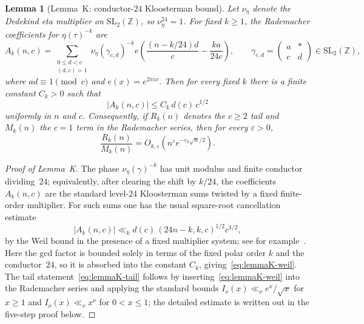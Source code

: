 \documentclass[11pt,a4paper]{article}
\newtheorem{lemma}[theorem]{Lemma}
\begin{document}
\begin{lemma}[Lemma~K: conductor-$24$ Kloosterman bound]\label{lem:K}
Let $\nu_{\eta}$ denote the Dedekind eta multiplier on $\mathrm{SL}_2(\mathbb Z)$, so $\nu_{\eta}^{24}=1$. For fixed $k\ge1$, the Rademacher coefficients for $\eta(\tau)^{-k}$ are
\[
  A_k(n,c)
  = \sum_{\substack{0\le d<c\\ (d,c)=1}}
    \nu_{\eta}(\gamma_{c,d})^{-k}
    e\!\left(\frac{(n-k/24)d}{c}-\frac{k a}{24c}\right),
  \qquad
  \gamma_{c,d}=\begin{pmatrix} a & *\\ c & d\end{pmatrix}\in \mathrm{SL}_2(\mathbb Z),
\]
where $ad\equiv 1\pmod c$ and $e(x)=e^{2\pi i x}$. Then for every fixed $k$ there is a finite constant $C_k>0$ such that
\begin{equation}\label{eq:lemmaK-weil}
  |A_k(n,c)| \le C_k\,d(c)\,c^{1/2}
\end{equation}
uniformly in $n$ and $c$. Consequently, if $R_k(n)$ denotes the $c\ge2$ tail and $M_k(n)$ the $c=1$ term in the Rademacher series, then for every $\varepsilon>0$,
\begin{equation}\label{eq:lemmaK-tail}
  \frac{R_k(n)}{M_k(n)}=O_{k,\varepsilon}\!\left(n^{\varepsilon}e^{-c_k\sqrt n/2}\right).
\end{equation}
\end{lemma}

\begin{proof}[Proof of Lemma~K]
The phase $\nu_{\eta}(\gamma)^{-k}$ has unit modulus and finite conductor dividing~$24$; equivalently, after clearing the shift by $k/24$, the coefficients $A_k(n,c)$ are the standard level-$24$ Kloosterman sums twisted by a fixed finite-order multiplier. For such sums one has the usual square-root cancellation estimate
\[
  |A_k(n,c)| \ll_k d(c)\,(24n-k,k,c)^{1/2}c^{1/2},
\]
by the Weil bound in the presence of a fixed multiplier system; see for example~\cite{Weil1948,Iwaniec1997,goldfeld1983}. Here the gcd factor is bounded solely in terms of the fixed polar order $k$ and the conductor~$24$, so it is absorbed into the constant $C_k$, giving~\eqref{eq:lemmaK-weil}. The tail statement~\eqref{eq:lemmaK-tail} follows by inserting~\eqref{eq:lemmaK-weil} into the Rademacher series and applying the standard bounds $I_{\nu}(x)\ll_{\nu} e^x/\sqrt{x}$ for $x\ge1$ and $I_{\nu}(x)\ll_{\nu} x^{\nu}$ for $0<x\le1$; the detailed estimate is written out in the five-step proof below.
\end{proof}
\end{document}
